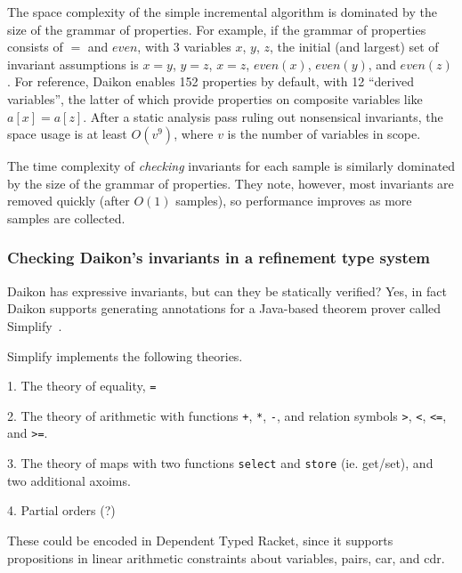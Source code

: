 The space complexity of the simple incremental algorithm is dominated 
by the size of the grammar of properties. For example, if the grammar
of properties consists of $=$ and $even$, with
3 variables $x$, $y$, $z$, the initial (and largest) set of invariant assumptions
is $x = y$, $y = z$, $x = z$, $even(x)$, $even(y)$, and $even(z)$.
For reference, Daikon enables 152 properties by default, with
12 ``derived variables'', the latter of which provide properties on composite variables
like $a[x] = a[z]$. After a static analysis pass ruling out nonsensical invariants,
the space usage is at least $O(v^9)$, where $v$ is the number of variables in scope.

The time complexity of \emph{checking} invariants for each sample
is similarly dominated by the size of the grammar of properties.
They note, however, most invariants are removed quickly (after
$O(1)$ samples), so performance improves as more samples
are collected.

\subsubsection{Checking Daikon's invariants in a refinement type system}

Daikon has expressive invariants, but can they be statically verified?
Yes, in fact Daikon supports generating annotations for a Java-based
theorem prover called Simplify~\cite{Detlefs03simplifya}.

Simplify implements the following theories.

1. The theory of equality, \texttt{=}

2. The theory of arithmetic with functions \texttt{+}, \texttt{*}, \texttt{-},
   and relation symbols \texttt{>}, \texttt{<}, \texttt{<=}, and \texttt{>=}.

3. The theory of maps with two functions \texttt{select} and \texttt{store} (ie. get/set),
   and two additional axoims.

4. Partial orders (?)

These could be encoded in Dependent Typed Racket, since it supports propositions
in linear arithmetic constraints about variables, pairs, car, and cdr.


